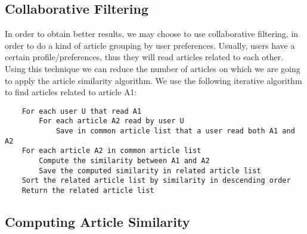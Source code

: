 \subsection{Collaborative Filtering}
\label{sec:collaborative-filtering}
In order to obtain better results, we may choose to use collaborative filtering, in order to do a kind of article grouping by user preferences. Usually, users have a certain profile/preferences, thus they will read articles related to each other. Using this technique we can reduce the number of articles on which we are going to apply the article similarity algorithm. We use the following iterative algorithm\cite{item-to-item-recomm} to find articles related to article A1:
\lstset{language=make,caption=Item to item collaborative filtering,label=lst:app-make}
\begin{lstlisting}
	For each user U that read A1
		For each article A2 read by user U
			Save in common article list that a user read both A1 and A2
	For each article A2 in common article list
		Compute the similarity between A1 and A2
		Save the computed similarity in related article list
	Sort the related article list by similarity in descending order
	Return the related article list
\end{lstlisting}

\subsection{Computing Article Similarity}
\label{sec:computing-article-similarity}

